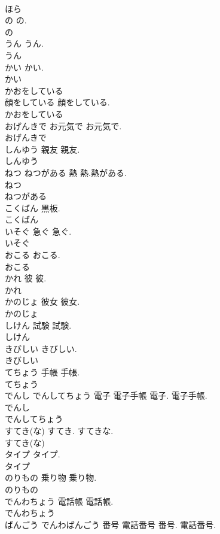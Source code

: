 \documentclass[8pt]{extreport}
\begin{document}
\begin{CJK}{UTF8}{min}
\\	ほら
\\	の		の.	
\\	の
\\	うん		うん.	
\\	うん
\\	かい		かい.	
\\	かい
\\	かおをしている	
\\	顔をしている	顔をしている.	
\\	かおをしている
\\	おげんきで	お元気で	お元気で.	
\\	おげんきで
\\	しんゆう	親友	親友.	
\\	しんゆう
\\	ねつ ねつがある	熱	熱.熱がある.	
\\	ねつ
\\	ねつがある
\\	こくばん		黒板.	
\\	こくばん
\\	いそぐ	急ぐ	急ぐ.	
\\	いそぐ
\\	おこる		おこる.	
\\	おこる
\\	かれ	彼	彼.	
\\	かれ
\\	かのじょ	彼女	彼女.	
\\	かのじょ
\\	しけん	試験	試験.	
\\	しけん
\\	きびしい		きびしい.	
\\	きびしい
\\	てちょう	手帳	手帳.	
\\	てちょう
\\	でんし でんしてちょう	電子 電子手帳	電子. 電子手帳.	
\\	でんし
\\	でんしてちょう
\\	すてき(な)		すてき. すてきな.	
\\	すてき(な)
\\	タイプ		タイプ.	
\\	タイプ
\\	のりもの	乗り物	乗り物.	
\\	のりもの
\\	でんわちょう	電話帳	電話帳.	
\\	でんわちょう
\\	ばんごう でんわばんごう	番号 電話番号	番号. 電話番号.	

\end{CJK}
\end{document}
